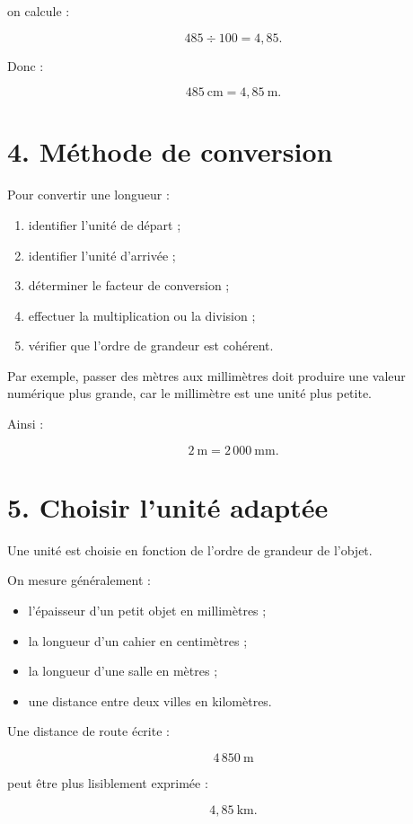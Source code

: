 on calcule :

\[
485\div100=4{,}85.
\]

Donc :

\[
\boxed{485\ \text{cm}=4{,}85\ \text{m}}.
\]

\section{4. Méthode de conversion}

Pour convertir une longueur :

\begin{enumerate}
\item identifier l’unité de départ ;
\item identifier l’unité d’arrivée ;
\item déterminer le facteur de conversion ;
\item effectuer la multiplication ou la division ;
\item vérifier que l’ordre de grandeur est cohérent.
\end{enumerate}

Par exemple, passer des mètres aux millimètres doit produire une valeur numérique plus grande, car le millimètre est une unité plus petite.

Ainsi :

\[
2\ \text{m}=2\,000\ \text{mm}.
\]

\section{5. Choisir l’unité adaptée}

Une unité est choisie en fonction de l’ordre de grandeur de l’objet.

On mesure généralement :

\begin{itemize}
\item l’épaisseur d’un petit objet en millimètres ;
\item la longueur d’un cahier en centimètres ;
\item la longueur d’une salle en mètres ;
\item une distance entre deux villes en kilomètres.
\end{itemize}

Une distance de route écrite :

\[
4\,850\ \text{m}
\]

peut être plus lisiblement exprimée :

\[
4{,}85\ \text{km}.
\]

